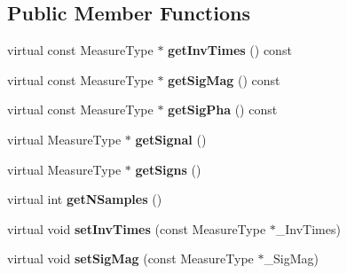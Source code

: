 \subsection*{Public Member Functions}
\begin{DoxyCompactItemize}
\item 
virtual const Measure\+Type $\ast$ {\bfseries get\+Inv\+Times} () const \hypertarget{class_ox_1_1_sign_calculator_aeae2b269b870b515f9da0ecb9a0c9dda}{}\label{class_ox_1_1_sign_calculator_aeae2b269b870b515f9da0ecb9a0c9dda}

\item 
virtual const Measure\+Type $\ast$ {\bfseries get\+Sig\+Mag} () const \hypertarget{class_ox_1_1_sign_calculator_abe5cfb287faab9e06e113bf33daa9b2e}{}\label{class_ox_1_1_sign_calculator_abe5cfb287faab9e06e113bf33daa9b2e}

\item 
virtual const Measure\+Type $\ast$ {\bfseries get\+Sig\+Pha} () const \hypertarget{class_ox_1_1_sign_calculator_a5d875d51f77739c61d8c6391d665ade9}{}\label{class_ox_1_1_sign_calculator_a5d875d51f77739c61d8c6391d665ade9}

\item 
virtual Measure\+Type $\ast$ {\bfseries get\+Signal} ()\hypertarget{class_ox_1_1_sign_calculator_ac4dc2ae5e3e5eee88d0a3a347a68a637}{}\label{class_ox_1_1_sign_calculator_ac4dc2ae5e3e5eee88d0a3a347a68a637}

\item 
virtual Measure\+Type $\ast$ {\bfseries get\+Signs} ()\hypertarget{class_ox_1_1_sign_calculator_a04d65630c95cf94ee6198193a5c0c346}{}\label{class_ox_1_1_sign_calculator_a04d65630c95cf94ee6198193a5c0c346}

\item 
virtual int {\bfseries get\+N\+Samples} ()\hypertarget{class_ox_1_1_sign_calculator_a6f1f77383cd088a1339ae91ce0b58e40}{}\label{class_ox_1_1_sign_calculator_a6f1f77383cd088a1339ae91ce0b58e40}

\item 
virtual void {\bfseries set\+Inv\+Times} (const Measure\+Type $\ast$\+\_\+\+Inv\+Times)\hypertarget{class_ox_1_1_sign_calculator_a184b9d2bd4b6677fef960aef40dbfe1c}{}\label{class_ox_1_1_sign_calculator_a184b9d2bd4b6677fef960aef40dbfe1c}

\item 
virtual void {\bfseries set\+Sig\+Mag} (const Measure\+Type $\ast$\+\_\+\+Sig\+Mag)\hypertarget{class_ox_1_1_sign_calculator_ad010dcfd41f343b7d9cad99a3c628468}{}\label{class_ox_1_1_sign_calculator_ad010dcfd41f343b7d9cad99a3c628468}


\end{DoxyCompactItemize}
